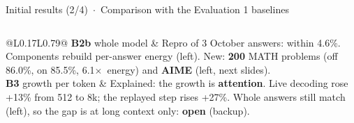 \documentclass[aspectratio=169,9pt]{beamer}
\newcommand{\x}{$\times$}
\begin{document}
\begin{frame}{Initial results (2/4) \,$\cdot$\, Comparison with the Evaluation 1 baselines}
\begin{columns}[T,onlytextwidth]
\begin{tabular}{@{}L{0.17\textwidth}L{0.79\textwidth}@{}}
      \textbf{B2b} whole model & Repro of 3 October answers: within 4.6\%. Components rebuild per-answer energy (left). New: \textbf{200} MATH problems (off 86.0\%, on 85.5\%, 6.1\x\ energy) and \textbf{AIME} (left, next slides). \\[2pt]
      \textbf{B3} growth per token & Explained: the growth is \textbf{attention}. Live decoding rose +13\% from 512 to 8k; the replayed step rises +27\%. Whole answers still match (left), so the gap is at long context only: \textbf{open} (backup). \\
      \bottomrule
    \end{tabular}
    \vspace{6pt}

  \end{columns}
\end{frame}
\end{document}
